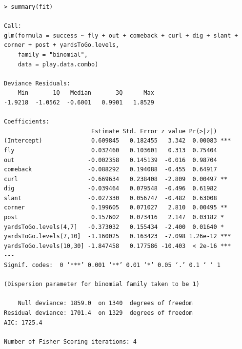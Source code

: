\documentclass[12pt,letterpaper]{article}
\begin{document}
\begin{lstlisting}[frame=single]
> summary(fit)

Call:
glm(formula = success ~ fly + out + comeback + curl + dig + slant + corner + post + yardsToGo.levels, 
    family = "binomial", 
    data = play.data.combo)

Deviance Residuals: 
    Min       1Q   Median       3Q      Max  
-1.9218  -1.0562  -0.6001   0.9901   1.8529  

Coefficients:
                         Estimate Std. Error z value Pr(>|z|)    
(Intercept)              0.609845   0.182455   3.342  0.00083 ***
fly                      0.032460   0.103601   0.313  0.75404    
out                     -0.002358   0.145139  -0.016  0.98704    
comeback                -0.088292   0.194088  -0.455  0.64917    
curl                    -0.669634   0.238408  -2.809  0.00497 ** 
dig                     -0.039464   0.079548  -0.496  0.61982    
slant                   -0.027330   0.056747  -0.482  0.63008    
corner                   0.199605   0.071027   2.810  0.00495 ** 
post                     0.157602   0.073416   2.147  0.03182 *  
yardsToGo.levels(4,7]   -0.373032   0.155434  -2.400  0.01640 *  
yardsToGo.levels(7,10]  -1.160025   0.163423  -7.098 1.26e-12 ***
yardsToGo.levels(10,30] -1.847458   0.177586 -10.403  < 2e-16 ***
---
Signif. codes:  0 ‘***’ 0.001 ‘**’ 0.01 ‘*’ 0.05 ‘.’ 0.1 ‘ ’ 1

(Dispersion parameter for binomial family taken to be 1)

    Null deviance: 1859.0  on 1340  degrees of freedom
Residual deviance: 1701.4  on 1329  degrees of freedom
AIC: 1725.4

Number of Fisher Scoring iterations: 4
\end{lstlisting}
\end{document}
